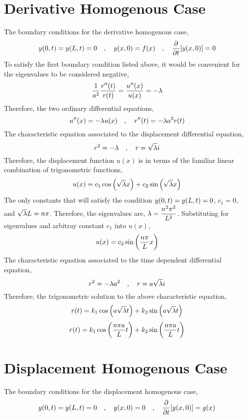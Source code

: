 \documentclass[class=report, 12pt, crop=false]{standalone}
\begin{document}
\begin{center}
\section{Derivative Homogenous Case}
\begin{comment}
\end{comment}
The boundary conditions for the derivative homogenous case,
$$y(0,t) = y(L,t) = 0\quad,\quad y(x,0) = f(x)\quad,\quad\frac{\partial }{\partial t}[y(x,0)] = 0$$
To satisfy the first boundary condition listed above, it would be convenient for the eigenvalues to be considered negative,
$$\frac{1}{a^2}\frac{r''(t)}{r(t)} = \frac{u''(x)}{u(x)} = -\lambda$$
Therefore, the two ordinary differential equations,
$$u''(x) = -\lambda u(x)\quad,\quad r''(t) = -\lambda a^2 r(t)$$
The characteristic equation associated to the displacement differential equation,
$$r^2 = -\lambda\quad,\quad r = \sqrt{\lambda}i$$
Therefore, the displacement function $u(x)$ is in terms of the familiar linear combination of trigonometric functions,
$$u(x) = c_1\cos\left(\sqrt{\lambda}x\right) + c_2\sin\left(\sqrt{\lambda}x\right)$$
The only constants that will satisfy the condition $\displaystyle{y(0,t) = y(L,t) = 0}$, $c_1 = 0$, and $\sqrt{\lambda}L = n\pi$. Therefore, the eigenvalues are, $\displaystyle{\lambda= \frac{n^2\pi^2}{L^2}}$. Substituting for eigenvalues and arbitray constant $c_1$ into $u(x)$,
$$u(x) = c_2\sin\left(\frac{n\pi}{L}x\right)$$
The characteristic equation associated to the time dependent differential equation,
$$r^2 = -\lambda a^2\quad,\quad r = a\sqrt{\lambda}i$$
Therefore, the trigonometric solution to the above characteristic equation,
$$r(t) = k_1\cos\left(a\sqrt{\lambda}t\right) + k_2\sin\left(a\sqrt{\lambda}t\right)$$
$$r(t) = k_1\cos\left(\frac{n\pi a}{L}t\right) + k_2\sin\left(\frac{n\pi a}{L}t\right)$$
\section{Displacement Homogenous Case}
\begin{comment}
\end{comment}
The boundary conditions for the displacement homogenous case,
$$y(0,t) = y(L,t) = 0\quad,\quad y(x,0) = 0\quad,\quad\frac{\partial }{\partial t}[y(x,0)] = g(x)$$
\end{center}
\end{document}
